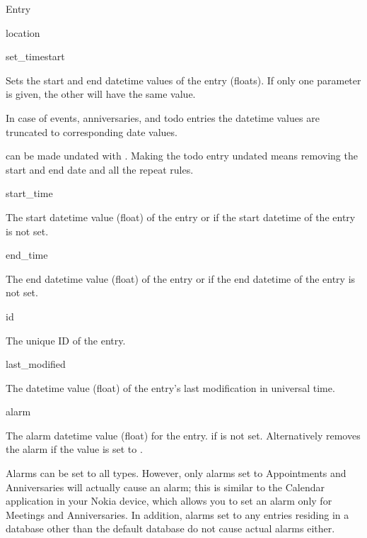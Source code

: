 \begin{classdesc*}{Entry}
\begin{memberdesc}[Entry]{location}
\end{memberdesc}

\begin{methoddesc}[Entry]{set_time}{start}

Sets the start and end datetime values of the entry (floats). If only one 
parameter is given, the other will have the same value. 

In case of events, anniversaries, and todo entries the datetime values are 
truncated to corresponding date values.

 can be made undated with 
. Making the todo entry undated means 
removing the start and end date and all the repeat rules.

\end{methoddesc}

\begin{memberdesc}[Entry]{start_time}

The start datetime value (float) of the entry or  if 
the start datetime of the entry is not set.

\end{memberdesc}

\begin{memberdesc}[Entry]{end_time}

The end datetime value (float) of the entry or  if the 
end datetime of the entry is not set.

\end{memberdesc}

\begin{memberdesc}[Entry]{id}

The unique ID of the entry.

\end{memberdesc}

\begin{memberdesc}[Entry]{last_modified}

The datetime value (float) of the entry's last modification in 
universal time.

\end{memberdesc}

\begin{memberdesc}[Entry]{alarm}

The alarm datetime value (float) for the entry.  if  is 
not set. Alternatively removes the alarm if the value is set to . 

Alarms can be set to all  types. However, only alarms set to 
Appointments and Anniversaries will actually cause an alarm; this is similar 
to the Calendar application in your Nokia device, which allows you to set an 
alarm only for Meetings and Anniversaries. In addition, alarms set to any 
entries residing in a database other than the default database do not cause 
actual alarms either.


\end{memberdesc}
\end{classdesc*}
